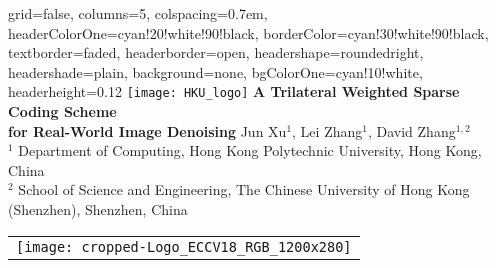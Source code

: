 \documentclass[landscape,a0paper,fontscale=0.292]{baposter}
\begin{document}
\begin{poster}{
 grid=false,
 columns=5,
 colspacing=0.7em,
 headerColorOne=cyan!20!white!90!black,
 borderColor=cyan!30!white!90!black,
 textborder=faded,
 headerborder=open,
 headershape=roundedright,
 headershade=plain,
 background=none,
 bgColorOne=cyan!10!white,
 headerheight=0.12\textheight}
 {
      \texttt{[image: HKU\_logo]}
      \makebox[0.01\textwidth]{} 
      \makebox[0.04\textwidth]{} 
 }
 {\sc\huge\bf A Trilateral Weighted Sparse Coding Scheme \\ for Real-World Image Denoising}
 {
 \vspace{0.1em} Jun Xu$^1$, Lei Zhang$^1$, David Zhang$^{1,2}$ 
 \\[0.1em]
 {
 $^1$ Department of Computing, Hong Kong Polytechnic University, Hong Kong, China
 \\
 $^2$ School of Science and Engineering, The Chinese University of Hong Kong (Shenzhen), Shenzhen, China
 \\[0.1em] 
 }
 }
 {
    \begin{tabular}{r}
        \texttt{[image: cropped-Logo\_ECCV18\_RGB\_1200x280]}
    \end{tabular}
 }

\end{poster}
\end{document}
